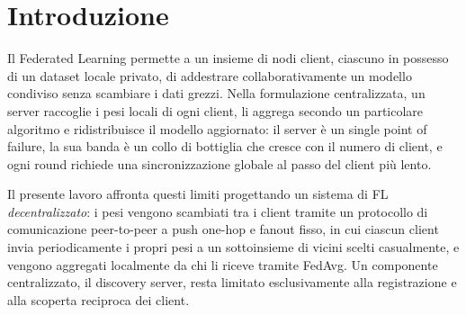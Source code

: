 \section{Introduzione}
\label{sec:introduction}

Il Federated Learning permette a un insieme di nodi client, ciascuno in
possesso di un dataset locale privato, di addestrare collaborativamente un
modello condiviso senza scambiare i dati grezzi. Nella formulazione centralizzata,
un server raccoglie i pesi locali
di ogni client, li aggrega secondo un particolare algoritmo e ridistribuisce il modello aggiornato: il server è
un single point of failure, la sua banda è un collo di bottiglia che cresce
con il numero di client, e ogni round richiede una sincronizzazione globale
al passo del client più lento.

Il presente lavoro affronta questi limiti progettando un sistema di FL
\emph{decentralizzato}: i pesi vengono scambiati tra i client tramite un
protocollo di comunicazione peer-to-peer a push one-hop e fanout fisso, in
cui ciascun client invia periodicamente i propri pesi a un sottoinsieme di
vicini scelti casualmente, e vengono aggregati localmente da chi li riceve
tramite FedAvg. Un componente centralizzato, il discovery server,
resta limitato esclusivamente alla registrazione e alla scoperta reciproca dei
client.
